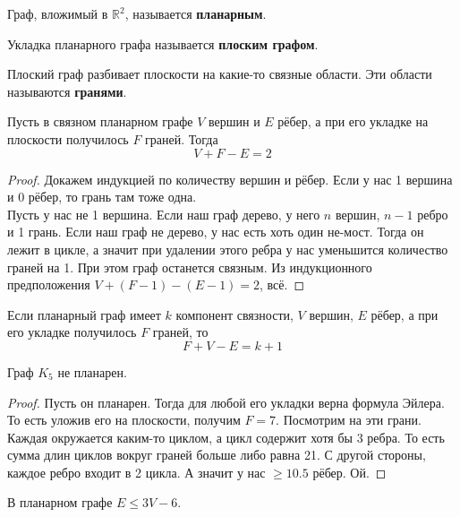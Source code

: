 \documentclass{article}
\begin{document}
    \begin{definition}
        Граф, вложимый в $\mathbb R^2$, называется \textbf{планарным}.
    \end{definition}
    \begin{definition}
        Укладка планарного графа называется \textbf{плоским графом}.
    \end{definition}
    \begin{definition}
        Плоский граф разбивает плоскости на какие-то связные области. Эти области называются \textbf{гранями}.
    \end{definition}
    \begin{theorem}
        Пусть в связном планарном графе $V$ вершин и $E$ рёбер, а при его
        укладке на плоскости получилось $F$ граней. Тогда
        $$V+F-E=2$$
    \end{theorem}
    \begin{proof}
        Докажем индукцией по количеству вершин и рёбер. Если у нас 1 вершина и 0 рёбер,
        то грань там тоже одна.\\
        Пусть у нас не 1 вершина. Если наш граф дерево, у него $n$ вершин, $n-1$ ребро и 1 грань. Если наш
        граф не дерево, у нас есть хоть один не-мост. Тогда он лежит в цикле, а значит при удалении этого
        ребра у нас уменьшится количество граней на 1. При этом граф останется связным. Из индукционного
        предположения $V+(F-1)-(E-1)=2$, всё.
    \end{proof}
    \begin{corollary}
        Если планарный граф имеет $k$ компонент связности, $V$ вершин, $E$ рёбер, а при его
        укладке получилось $F$ граней, то
        $$F+V-E=k+1$$
    \end{corollary}
    \begin{lemma}
        Граф $K_5$ не планарен.
    \end{lemma}
    \begin{proof}
        Пусть он планарен. Тогда для любой его укладки верна формула Эйлера. То есть уложив его на плоскости, получим $F=7$. Посмотрим на эти грани. Каждая окружается каким-то циклом, а цикл содержит хотя бы 3 ребра. То есть сумма длин циклов вокруг граней больше либо равна 21. С другой стороны, каждое ребро входит в 2 цикла. А значит у нас $\geqslant10.5$ рёбер. Ой.
    \end{proof}
    \begin{claim}
        В планарном графе $E\leqslant3V-6$.
    \end{claim}
\end{document}
